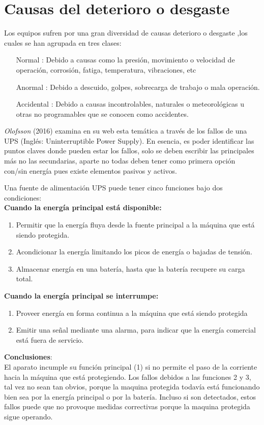 \documentclass[
	12pt, %
	fleqn, %
	a4paper, %
	oneside, %
]{LegrandOrangeBook}
\begin{document}
\section{Causas del deterioro o desgaste}
Los equipos sufren por una gran diversidad de causas deterioro o desgaste ,los cuales se han agrupada en tres clases:
\begin{itemize}
\item[Normal]: Debido a causas como la presión, movimiento o velocidad de operación, corrosión, fatiga, temperatura, vibraciones, etc
\item[Anormal]: Debido a descuido, golpes, sobrecarga de trabajo o mala operación.
\item[Accidental]: Debido a causas incontrolables, naturales o meteorológicas u otras no programables que se conocen como accidentes.
\end{itemize}
\emph{Olofsson} (2016) examina en su web esta temática a través de los fallos de una UPS
(Inglés: Uninterruptible Power Supply). En esencia, es poder identificar las puntos claves donde pueden estar los fallos, solo se deben escribir las principales más no las secundarias, aparte no todas deben tener como primera opción con/sin energía pues existe elementos pasivos y activos.
\begin{example}
Una fuente de alimentación UPS puede tener cinco funciones bajo dos condiciones:\\
\textbf{Cuando la energía principal está disponible: }
\begin{enumerate}
\item Permitir que la energía fluya desde la fuente principal a la máquina que está siendo protegida.
\item Acondicionar la energía limitando los picos de energía o bajadas de tensión.
\item Almacenar energía en una batería, hasta que la batería recupere su carga total.
\end{enumerate}
\textbf{Cuando la energía principal se interrumpe:}
\begin{enumerate}
\item Proveer energía en forma continua a la máquina que está siendo protegida
\item Emitir una señal mediante una alarma, para indicar que la energía comercial está fuera de servicio.
\end{enumerate}
\textbf{Conclusiones}:\\
El aparato incumple su función principal (1) si no permite el paso de la corriente hacia la máquina que está protegiendo. Los fallos debidos a las funciones 2 y 3, tal vez no sean tan obvios, porque la maquina protegida todavía está funcionando bien sea por la energía principal o por la batería. Incluso si son detectados, estos fallos puede que no provoque medidas correctivas porque la maquina
protegida sigue operando.
\end{example}
\end{document}
